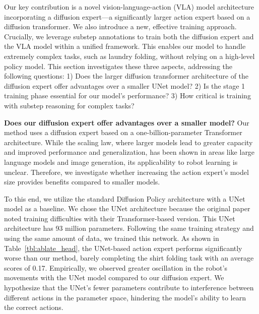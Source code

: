 Our key contribution is a novel vision-language-action (VLA) model architecture incorporating a diffusion expert—a significantly larger action expert based on a diffusion transformer. We also introduce a new, effective training approach. Crucially, we leverage substep annotations to train both the diffusion expert and the VLA model within a unified framework. This enables our model to handle extremely complex tasks, such as laundry folding, without relying on a high-level policy model. This section investigates these three aspects, addressing the following questions: 1) Does the larger diffusion transformer architecture of the diffusion expert offer advantages over a smaller UNet model? 2) Is the stage 1 training phase essential for our model's performance? 3) How critical is training with substep reasoning for complex tasks?


\textbf{Does our diffusion expert offer advantages over a smaller model?} Our method uses a diffusion expert based on a one-billion-parameter Transformer architecture. While the scaling law, where larger models lead to greater capacity and improved performance and generalization, has been shown in areas like large language models and image generation, its applicability to robot learning is unclear.  Therefore, we investigate whether increasing the action expert's model size provides benefits compared to smaller models.

To this end, we utilize the standard Diffusion Policy architecture with a UNet model as a baseline.  We chose the UNet architecture because the original paper noted training difficulties with their Transformer-based version. This UNet architecture has 93 million parameters.  Following the same training strategy and using the same amount of data, we trained this network. As shown in Table~\ref{tbl:ablate_head}, the UNet-based action expert performs significantly worse than our method, barely completing the shirt folding task with an average scores of 0.17.  Empirically, we observed greater oscillation in the robot's movements with the UNet model compared to our diffusion expert. We hypothesize that the UNet's fewer parameters contribute to interference between different actions in the parameter space, hindering the model's ability to learn the correct actions.


